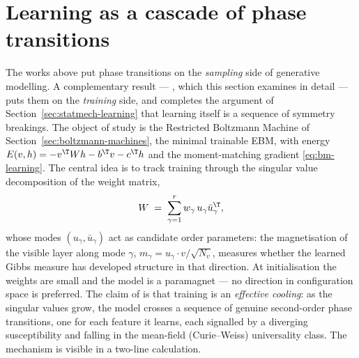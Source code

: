 \section{Learning as a cascade of phase transitions}\label{sec:cascade}

The works above put phase transitions on the \emph{sampling} side of
generative modelling. A complementary result --- \citet{bachtis2024cascade},
which this section examines in detail --- puts them on the \emph{training}
side, and completes the argument of Section~\ref{sec:statmech-learning}
that learning itself is a sequence of symmetry breakings. The object of
study is the Restricted Boltzmann Machine of
Section~\ref{sec:boltzmann-machines}, the minimal trainable EBM, with
energy $E(v, h) = -v^\T W h - b^\T v - c^\T h$ and the moment-matching
gradient \eqref{eq:bm-learning}. The central idea is to track training
through the singular value decomposition of the weight matrix,
\begin{equation}
  W \;=\; \sum_{\gamma=1}^{r} w_\gamma\, u_\gamma \bar u_\gamma^\T ,
  \label{eq:rbm-svd}
\end{equation}
whose modes $(u_\gamma, \bar u_\gamma)$ act as candidate order parameters:
the magnetisation of the visible layer along mode $\gamma$,
$m_\gamma = u_\gamma \cdot v / \sqrt{N_v}$, measures whether the learned
Gibbs measure has developed structure in that direction. At initialisation
the weights are small and the model is a paramagnet --- no direction in
configuration space is preferred. The claim of \citet{bachtis2024cascade}
is that training is an \emph{effective cooling}: as the singular values
grow, the model crosses a sequence of genuine second-order phase
transitions, one for each feature it learns, each signalled by a diverging
susceptibility and falling in the mean-field (Curie--Weiss) universality
class. The mechanism is visible in a two-line calculation.

